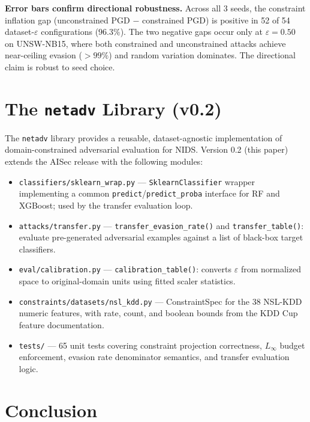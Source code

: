 \documentclass[sigconf,anonymous=true]{acmart}
\begin{document}
\textbf{Error bars confirm directional robustness.}
Across all 3 seeds, the constraint inflation gap (unconstrained PGD
$-$ constrained PGD) is positive in 52 of 54 dataset-$\varepsilon$
configurations ($96.3\%$).  The two negative gaps occur only at
$\varepsilon = 0.50$ on UNSW-NB15, where both constrained and
unconstrained attacks achieve near-ceiling evasion ($>99\%$) and
random variation dominates.  The directional claim is robust to
seed choice.

\section{The \texttt{netadv} Library (v0.2)}
\label{sec:tool}

The \texttt{netadv} library provides a reusable, dataset-agnostic
implementation of domain-constrained adversarial evaluation for NIDS.
Version 0.2 (this paper) extends the AISec release with the following
modules:

\begin{itemize}
  \item \texttt{classifiers/sklearn\_wrap.py} — \texttt{SklearnClassifier}
        wrapper implementing a common \texttt{predict}/\texttt{predict\_proba}
        interface for RF and XGBoost; used by the transfer evaluation loop.
  \item \texttt{attacks/transfer.py} — \texttt{transfer\_evasion\_rate()}
        and \texttt{transfer\_table()}: evaluate pre-generated adversarial
        examples against a list of black-box target classifiers.
  \item \texttt{eval/calibration.py} — \texttt{calibration\_table()}:
        converts $\varepsilon$ from normalized space to original-domain
        units using fitted scaler statistics.
  \item \texttt{constraints/datasets/nsl\_kdd.py} — ConstraintSpec for
        the 38 NSL-KDD numeric features, with rate, count, and boolean
        bounds from the KDD Cup feature documentation.
  \item \texttt{tests/} — 65 unit tests covering constraint projection
        correctness, $L_\infty$ budget enforcement, evasion rate
        denominator semantics, and transfer evaluation logic.
\end{itemize}

\section{Conclusion}
\label{sec:conclusion}
\end{document}
